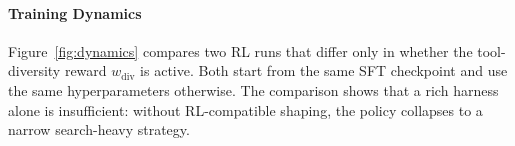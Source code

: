 \documentclass{article}
\newcommand{\sys}{\texttt{Harness-1}\xspace}
\newcommand{\verify}{\texttt{verify}\xspace}
\newcommand{\curate}{\texttt{curate}\xspace}
\begin{document}



\paragraph{Training Dynamics}
\label{sec:dynamics}
Figure~\ref{fig:dynamics} compares two RL runs that differ only in
whether the tool-diversity reward $w_{\mathrm{div}}$ is active.
Both start from the same SFT checkpoint and use the same
hyperparameters otherwise. The comparison shows that a rich harness
alone is insufficient: without RL-compatible shaping, the policy
collapses to a narrow search-heavy strategy.
\end{document}
